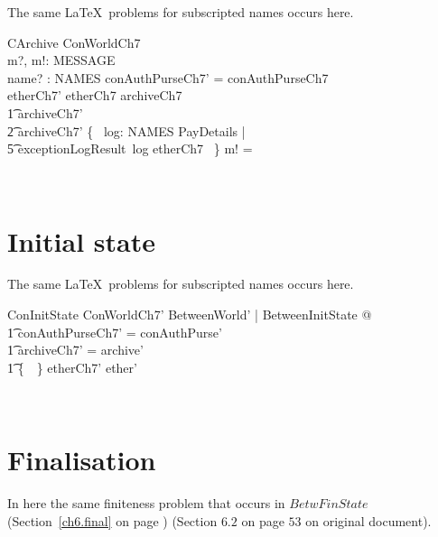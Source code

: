 The same \LaTeX\ problems for subscripted names occurs here.
%
\begin{LSDef}
\begin{schema}{CArchive}
  \Delta ConWorldCh7
  \\      m?, m!: MESSAGE
  \\      name? : NAMES
  \where
  conAuthPurseCh7' = conAuthPurseCh7
  \\      etherCh7' \subseteq etherCh7
  \also
  archiveCh7 \subseteq
  \\ \t1          archiveCh7' \subseteq
  \\ \t2          archiveCh7' \cup \{~ log: NAMES \cross PayDetails |
  \\ \t5                          exceptionLogResult~log \in etherCh7 ~\}
  \also
  m! = \bot
\end{schema}~\end{LSDef}

\section{Initial state}

The same \LaTeX\ problems for subscripted names occurs here.
%
\begin{LSDef}
\begin{schema}{ConInitState}
  ConWorldCh7'
  \where
  \exists BetweenWorld' | BetweenInitState @
  \\ \t1          conAuthPurseCh7' = conAuthPurse'
  \\ \t1          \land archiveCh7' = archive'
  \\ \t1          \land \{~\bot~\} \subseteq etherCh7' \subseteq ether'
\end{schema}~\end{LSDef}

\section{Finalisation}

In here the same finiteness problem that occurs in $BetwFinState$
(Section~\ref{ch6.final} on page \pageref{ch6.final}) (Section $6.2$ on page
$53$ on original document).

